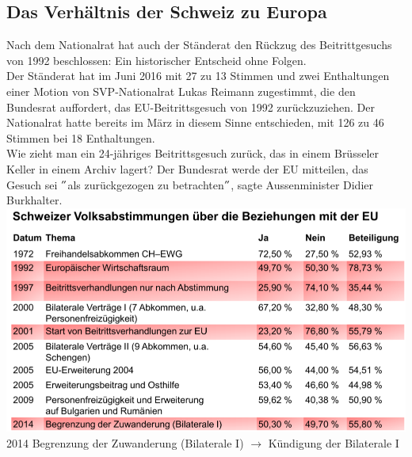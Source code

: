 \subsection{Das Verhältnis der Schweiz zu Europa}
\begin{multicols}{2}
	Nach dem Nationalrat hat auch der Ständerat den Rückzug des Beitrittgesuchs von 1992 beschlossen: Ein historischer Entscheid ohne Folgen.\\
	Der Ständerat hat im Juni 2016 mit 27 zu 13 Stimmen und zwei Enthaltungen einer Motion von SVP-Nationalrat Lukas Reimann zugestimmt, die den Bundesrat auffordert, das EU-Beitrittsgesuch von 1992 zurückzuziehen. Der Nationalrat hatte bereits im März in diesem Sinne entschieden, mit 126 zu 46 Stimmen bei 18 Enthaltungen.\\
	Wie zieht man ein 24-jähriges Beitrittsgesuch zurück, das in einem Brüsseler Keller in einem Archiv lagert? Der Bundesrat werde der EU mitteilen, das Gesuch sei $"$als zurückgezogen zu betrachten$"$, sagte Aussenminister Didier Burkhalter.
	\vfill\null
	\columnbreak
	\includegraphics[width=\linewidth]{images/beziehung.png}
	2014 Begrenzung der Zuwanderung (Bilaterale I) $\rightarrow$ Kündigung der Bilaterale I
\end{multicols}
\clearpage
\pagebreak